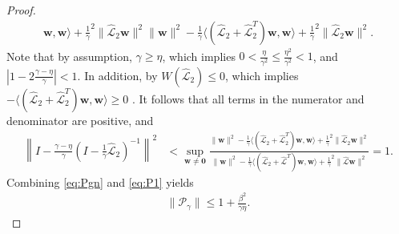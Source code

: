 \documentclass[review]{siamart}
\begin{document}
\begin{proof}
\begin{align*}
{		\mathbf{w},\mathbf{w}\rangle + \tfrac{1}{\gamma}^2\|\widehat{\mathcal{L}}_2\mathbf{w}\|^2}
	{\|\mathbf{w}\|^2 - \tfrac{1}{\gamma}\langle (\widehat{\mathcal{L}}_2 + \widehat{\mathcal{L}}_2^T)
		\mathbf{w},\mathbf{w}\rangle + \tfrac{1}{\gamma}^2\|\widehat{\mathcal{L}}_2\mathbf{w}\|^2}.
\end{align*}
%
Note that by assumption, $\gamma \geq \eta$, which implies
$0< \tfrac{\eta}{\gamma^2} \leq \tfrac{\eta^2}{\gamma^2}  < 1$, and 
$|1 - 2\tfrac{\gamma-\eta}{\gamma}| < 1$. In addition, by  $W(\widehat{\mathcal{L}}_2)\leq 0$,
which implies $-\langle (\widehat{\mathcal{L}}_2+\widehat{\mathcal{L}}_2^T)\mathbf{w},\mathbf{w}\rangle \geq 0$
\cite{gustafson1997numerical,mees1979domains}.
It follows that all terms in the numerator and denominator are positive, and
%
\begin{align} \label{eq:P1}
\left\| I - \tfrac{\gamma-\eta}
	{\gamma}(I - \tfrac{1}{\gamma}\widehat{\mathcal{L}}_2)^{-1}\right\|^2
& < \sup_{\mathbf{w}\neq\mathbf{0}} \frac{\|\mathbf{w}\|^2
	- \tfrac{1}{\gamma}\langle (\widehat{\mathcal{L}}_2 + \widehat{\mathcal{L}}_2^T)
		\mathbf{w},\mathbf{w}\rangle + \tfrac{1}{\gamma}^2\|\widehat{\mathcal{L}}_2\mathbf{w}\|^2}
	{\|\mathbf{w}\|^2 - \tfrac{1}{\gamma}\langle (\widehat{\mathcal{L}}_2 + \widehat{\mathcal{L}}^T)
		\mathbf{w},\mathbf{w}\rangle + \tfrac{1}{\gamma}^2\|\widehat{\mathcal{L}}\mathbf{w}\|^2} 
= 1.
\end{align}
%
Combining \eqref{eq:Pgn} and \eqref{eq:P1} yields
%
\begin{align}\label{eq:Pgamma_gen}
\|\mathcal{P}_\gamma\| \leq 1 + \frac{\beta^2}{\gamma\eta}.
\end{align}


\end{proof}
\end{document}
